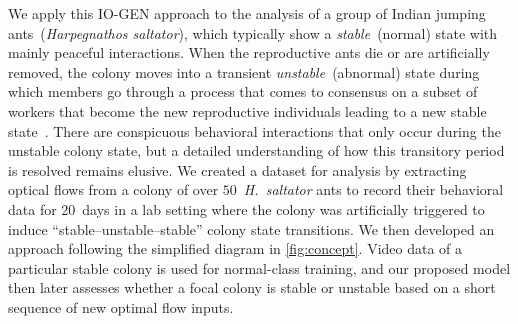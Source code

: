 \documentclass[letterpaper]{article} %
\let\orgautoref\autoref
\renewcommand{\autoref}
{\def\equationautorefname{Equation}%
	\def\figureautorefname{Fig.}%
	\def\subfigureautorefname{Fig.}%
	\def\Itemautorefname{item}%
	\def\tableautorefname{Table}%
	\def\exerciseautorefname{Exercise}%
	\def\starexerciseautorefname{Exercise}%
	\def\sectionautorefname{Section}%
	\def\subsectionautorefname{Section}%
	\def\subsubsectionautorefname{Section}%
	\def\chapterautorefname{Section}%
	\def\partautorefname{Part}%
	\orgautoref}
\begin{document}
We apply this \mbox{IO-GEN} approach to the analysis of a group of Indian
jumping ants~(\emph{Harpegnathos saltator}), which typically show a
\emph{stable}~(normal) state with mainly peaceful interactions.
When the reproductive ants die or are artificially removed,
the colony moves into a transient \emph{unstable}~(abnormal) state during
which members go through a process that comes to consensus on a subset of
workers that become the new reproductive individuals leading to a
new stable state~\citep{SPSHPL16}.
There are conspicuous behavioral interactions that only occur during
the unstable colony state, but a detailed understanding of how this
transitory period is resolved remains elusive.
We created a dataset for analysis by
extracting optical flows from a colony of over $50$~\emph{H.~saltator}
ants to record their behavioral data for $20$~days in a lab setting
where the colony was artificially triggered to induce
``stable--unstable--stable'' colony state transitions. We then developed
an approach following the simplified diagram in \autoref{fig:concept}.
Video data of a particular stable colony is used for normal-class
training, and our proposed model then later assesses whether a focal
colony is stable or unstable based on a short sequence of new optimal
flow inputs.

\end{document}
